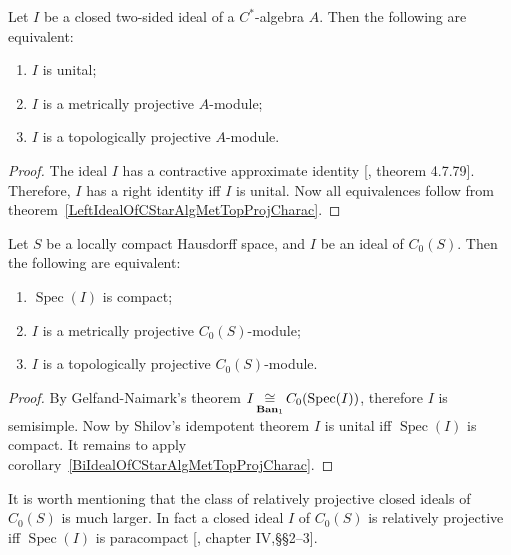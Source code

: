 \begin{corollary}\label{BiIdealOfCStarAlgMetTopProjCharac} Let $I$ be a closed
two-sided ideal of a $C^*$-algebra $A$. Then the following are equivalent:

\begin{enumerate}[label = (\roman*)]
    \item $I$ is unital;

    \item $I$ is a metrically projective $A$-module;

    \item $I$ is a topologically projective $A$-module.
\end{enumerate}
\end{corollary}
\begin{proof} The ideal $I$ has a contractive approximate identity
[\cite{HelBanLocConvAlg}, theorem 4.7.79]. Therefore, $I$ has a right identity
iff $I$ is unital. Now all equivalences follow from
theorem~\ref{LeftIdealOfCStarAlgMetTopProjCharac}. 
\end{proof}

\begin{corollary}\label{IdealofCommCStarAlgMetTopProjCharac} Let $S$ be a
locally compact Hausdorff space, and $I$ be an ideal of $C_0(S)$. Then the
following are equivalent:

\begin{enumerate}[label = (\roman*)]
    \item $\operatorname{Spec}(I)$ is compact;

    \item $I$ is a metrically projective $C_0(S)$-module;

    \item $I$ is a topologically projective $C_0(S)$-module.
\end{enumerate}
\end{corollary}
\begin{proof} By Gelfand-Naimark's theorem
$I\mathop{\mathbin{\cong}}\limits_{\mathbf{Ban}_1}C_0(\operatorname{Spec}(I))$, therefore $I$ is
semisimple. Now by Shilov's idempotent theorem $I$ is unital iff
$\operatorname{Spec}(I)$ is compact. It remains to apply
corollary~\ref{BiIdealOfCStarAlgMetTopProjCharac}. 
\end{proof}

It is worth mentioning that the class of relatively projective closed ideals of
$C_0(S)$ is much larger. In fact a closed ideal $I$ of $C_0(S)$ is relatively
projective iff $\operatorname{Spec}(I)$ is paracompact
[\cite{HelHomolBanTopAlg}, chapter IV,\S\S 2--3].

